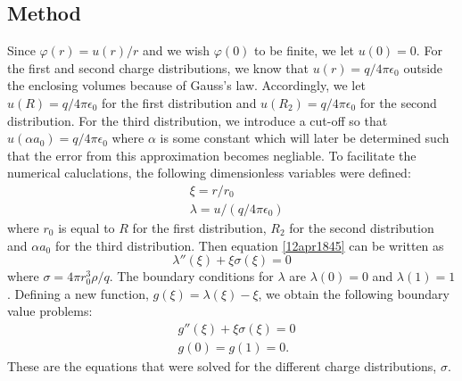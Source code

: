 \documentclass[twocolumn]{article}
\begin{document}
\begin{large}
\subsection*{Method}
Since $\varphi(r) = u(r)/r$ and we wish $\varphi(0)$ to be finite, we let $u(0) = 0$. For the first and second charge distributions, we know that $u(r) = q/4\pi\epsilon_0$ outside the enclosing volumes because of Gauss's law. Accordingly, we let $u(R) = q/4\pi\epsilon_0$ for the first distribution and $u(R_2) = q/4\pi\epsilon_0$ for the second distribution. For the third distribution, we introduce a cut-off so that $u(\alpha a_0) = q/4\pi\epsilon_0$ where $\alpha$ is some constant which will later be determined such that the error from this approximation becomes negliable. To facilitate the numerical caluclations, the following dimensionless variables were defined:
\begin{equation}
    \begin{split}
        &\xi = r/r_0 \\ 
        &\lambda = u/(q/4\pi\epsilon_0)
    \end{split}
\end{equation}
where $r_0$ is equal to $R$ for the first distribution, $R_2$ for the second distribution and $\alpha a_0$ for the third distribution. Then equation \eqref{12apr1845} can be written as
\begin{equation}
    \lambda''(\xi) + \xi\sigma(\xi) = 0
\end{equation}
where $\sigma = 4\pi r_0^3\rho/q$. The boundary conditions for $\lambda$ are $\lambda(0) = 0$ and $\lambda(1)=1$. Defining a new function, $g(\xi) = \lambda(\xi) - \xi$, we obtain the following boundary value problems:
\begin{equation}
    \label{17apr0918}
    \begin{split}
        &g''(\xi) + \xi\sigma(\xi) = 0 \\ 
        &g(0) = g(1) = 0.
    \end{split}
\end{equation}
These are the equations that were solved for the different charge distributions, $\sigma$.


\end{large}
\end{document}
